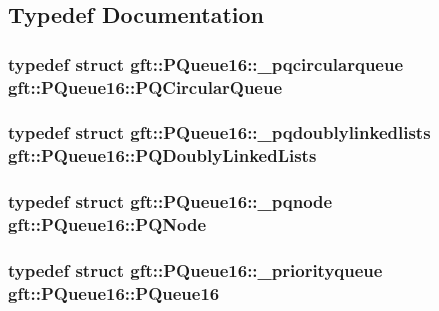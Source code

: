 \subsection{Typedef Documentation}
\hypertarget{namespacegft_1_1PQueue16_a9170c804b2c99b8035274bfc820f968e}{
\subsubsection[{P\-Q\-Circular\-Queue}]{\setlength{\rightskip}{0pt plus 5cm}typedef struct {\bf gft\-::\-P\-Queue16\-::\-\_\-pqcircularqueue}  {\bf gft\-::\-P\-Queue16\-::\-P\-Q\-Circular\-Queue}}}\label{namespacegft_1_1PQueue16_a9170c804b2c99b8035274bfc820f968e}
\hypertarget{namespacegft_1_1PQueue16_a2e506a5582bb0b3b911d561e82164a46}{
\subsubsection[{P\-Q\-Doubly\-Linked\-Lists}]{\setlength{\rightskip}{0pt plus 5cm}typedef struct {\bf gft\-::\-P\-Queue16\-::\-\_\-pqdoublylinkedlists}  {\bf gft\-::\-P\-Queue16\-::\-P\-Q\-Doubly\-Linked\-Lists}}}\label{namespacegft_1_1PQueue16_a2e506a5582bb0b3b911d561e82164a46}
\hypertarget{namespacegft_1_1PQueue16_a2dc28c8f2a9eaeb5d7d7ae7ec5429314}{
\subsubsection[{P\-Q\-Node}]{\setlength{\rightskip}{0pt plus 5cm}typedef struct {\bf gft\-::\-P\-Queue16\-::\-\_\-pqnode}  {\bf gft\-::\-P\-Queue16\-::\-P\-Q\-Node}}}\label{namespacegft_1_1PQueue16_a2dc28c8f2a9eaeb5d7d7ae7ec5429314}
\hypertarget{namespacegft_1_1PQueue16_afab9efb91a79a40b6b74c53c0c19da3d}{
\subsubsection[{P\-Queue16}]{\setlength{\rightskip}{0pt plus 5cm}typedef struct {\bf gft\-::\-P\-Queue16\-::\-\_\-priorityqueue}  {\bf gft\-::\-P\-Queue16\-::\-P\-Queue16}}}\label{namespacegft_1_1PQueue16_afab9efb91a79a40b6b74c53c0c19da3d}


